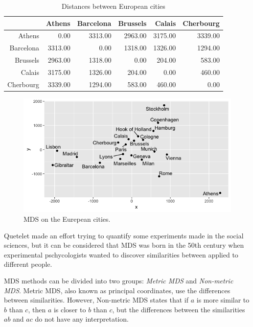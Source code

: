 \documentclass[11pt]{report}
\begin{document}
\begin{table}[ht]
\centering
\begin{tabular}{rrrrrr}
  \hline
 & Athens & Barcelona & Brussels & Calais & Cherbourg \\ 
  \hline
Athens & 0.00 & 3313.00 & 2963.00 & 3175.00 & 3339.00 \\ 
  Barcelona & 3313.00 & 0.00 & 1318.00 & 1326.00 & 1294.00 \\ 
  Brussels & 2963.00 & 1318.00 & 0.00 & 204.00 & 583.00 \\ 
  Calais & 3175.00 & 1326.00 & 204.00 & 0.00 & 460.00 \\ 
  Cherbourg & 3339.00 & 1294.00 & 583.00 & 460.00 & 0.00 \\ 
   \hline
\end{tabular}
\caption{Distances between European cities} 
\label{european_distances}
\end{table}
\begin{figure}[h]
\centering
    \includegraphics[scale = 0.5]{./images/europ_cities.png}
    \caption{MDS on the Eurepean cities.}
    \label{europ_cities}
\end{figure}

\indent Quetelet made an effort trying to quantify some experiments made in the
social sciences, but it can be considered that MDS was born in the 50th century 
when experimental pschycologists wanted to discover similarities between 
applied to different people.

\indent MDS methods can be divided into two groups: \textit{Metric MDS} and
\textit{Non-metric MDS}. Metric MDS, also known as principal coordinates, use
the differences between similarities. However, Non-metric MDS states that if $a$
is more similar to $b$ than $c$, then $a$ is closer to $b$ than $c$, but the
differences between the similarities $ab$ and $ac$ do not have any 
interpretation.
\end{document}
